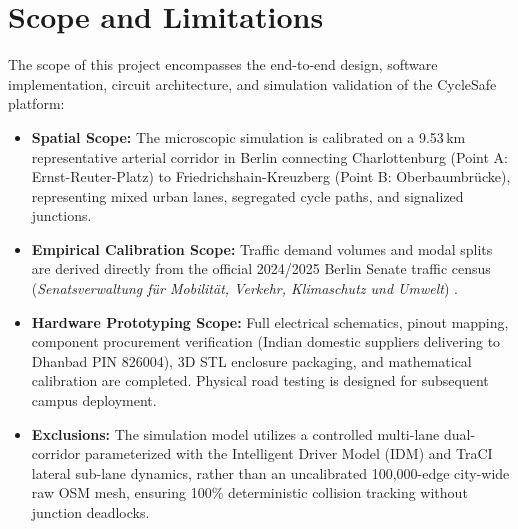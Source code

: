 \section{Scope and Limitations}
The scope of this project encompasses the end-to-end design, software implementation, circuit architecture, and simulation validation of the CycleSafe platform:
\begin{itemize}
    \item \textbf{Spatial Scope:} The microscopic simulation is calibrated on a 9.53\,km representative arterial corridor in Berlin connecting Charlottenburg (Point A: Ernst-Reuter-Platz) to Friedrichshain-Kreuzberg (Point B: Oberbaumbr{\"u}cke), representing mixed urban lanes, segregated cycle paths, and signalized junctions.
    \item \textbf{Empirical Calibration Scope:} Traffic demand volumes and modal splits are derived directly from the official 2024/2025 Berlin Senate traffic census (\textit{Senatsverwaltung f{\"u}r Mobilit{\"a}t, Verkehr, Klimaschutz und Umwelt}) \cite{berlin2025report}.
    \item \textbf{Hardware Prototyping Scope:} Full electrical schematics, pinout mapping, component procurement verification (Indian domestic suppliers delivering to Dhanbad PIN 826004), 3D STL enclosure packaging, and mathematical calibration are completed. Physical road testing is designed for subsequent campus deployment.
    \item \textbf{Exclusions:} The simulation model utilizes a controlled multi-lane dual-corridor parameterized with the Intelligent Driver Model (IDM) and TraCI lateral sub-lane dynamics, rather than an uncalibrated 100,000-edge city-wide raw OSM mesh, ensuring 100\% deterministic collision tracking without junction deadlocks.
\end{itemize}

